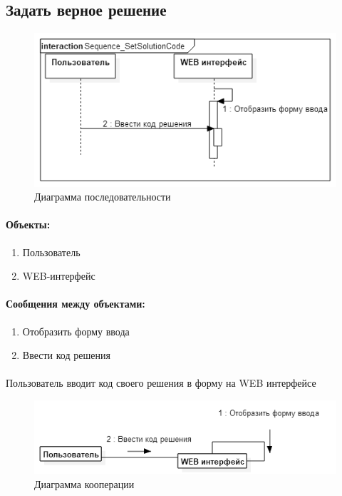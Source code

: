\documentclass{article}
\begin{document}
    \subsection{Задать верное решение}
        \begin{figure}[H]
            \includegraphics[width=\textwidth, center]
                {Sequence_SetSolutionCode}
            \caption{Диаграмма последовательности}
        \end{figure}
        \paragraph{Объекты:}
        \begin{enumerate}
            \item Пользователь
            \item WEB-интерфейс
        \end{enumerate}
        \paragraph{Сообщения между объектами:}
        \begin{enumerate}
            \item Отобразить форму ввода
            \item Ввести код решения
        \end{enumerate}
        \paragraph{}
        Пользователь вводит код своего решения в форму на WEB интерфейсе
        \begin{figure}[H]
            \includegraphics[width=\textwidth, center]
                {Communication_SetSolutionCode}
            \caption{Диаграмма кооперации}
        \end{figure}
\end{document}
